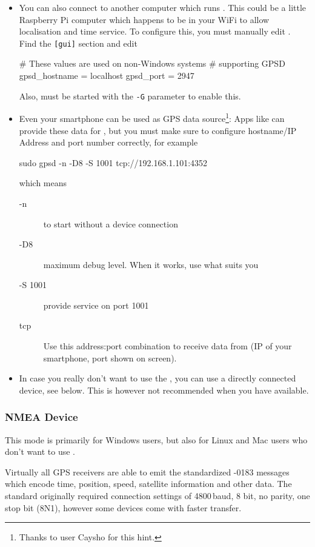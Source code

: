 \begin{itemize}
\item You can also connect to another computer which runs
  . This could be a little Raspberry Pi computer which
  happens to be in your WiFi to allow localisation and time service.
 To configure this, you must manually edit
  . Find the \texttt{[gui]} section and edit
\begin{configfile}
[gui]
# These values are used on non-Windows systems 
# supporting GPSD
gpsd_hostname   = localhost
gpsd_port       = 2947 
\end{configfile}
Also,  must be started with the \texttt{-G} parameter to
enable this.
\item Even your smartphone can be used as GPS data
  source\footnote{Thanks to user Caysho for this hint.}: Apps like
   can provide these data for , but
  you must make sure to configure hostname/IP Address and port number
  correctly, for example
  \begin{commands}
 sudo gpsd -n -D8 -S 1001 tcp://192.168.1.101:4352
  \end{commands}
which means
\begin{description}
\item[-n] to start without a device connection
\item[-D8] maximum debug level. When it works, use what suits you
\item[-S 1001] provide service on port 1001
\item[tcp] Use this address:port combination to receive data from (IP of
  your smartphone, port shown on  screen).
\end{description}
\item In case you really don't want to use the , you can
  use a directly connected device, see below. This is however not
  recommended when you have  available.
\end{itemize}


\subsubsection{NMEA Device}
\label{sec:ExtraData:GPS:NMEA}

This mode is primarily for Windows users, but also for Linux and Mac
users who don't want to use .

Virtually all GPS receivers are able to emit the standardized
-0183 messages which encode time, position, speed,
satellite information and other data.  The standard originally
required connection settings of 4800\,baud, 8 bit, no parity, one stop
bit (8N1), however some devices come with faster transfer.

